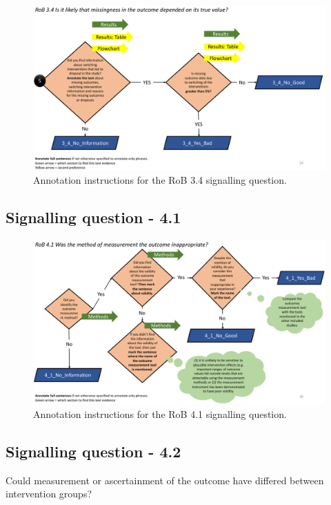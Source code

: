 \documentclass[sn-mathphys,Numbered]{sn-jnl}%
\begin{document}
\begin{figure}[hbt]
    \centering
    \includegraphics[width=\textwidth]{figures/3_4_5.pdf}
    \caption{Annotation instructions for the RoB 3.4 signalling question.}
    \label{fig:3_4_5}
\end{figure}
%
%
%
\subsection*{Signalling question - 4.1 }
%
\begin{figure}[hbt]
    \centering
    \includegraphics[width=\textwidth]{figures/4_1.pdf}
    \caption{Annotation instructions for the RoB 4.1 signalling question.}
    \label{fig:4_1}
\end{figure}
%
%
%
\subsection*{Signalling question - 4.2 }
%
Could measurement or ascertainment of the outcome have differed between intervention groups?
\end{document}
